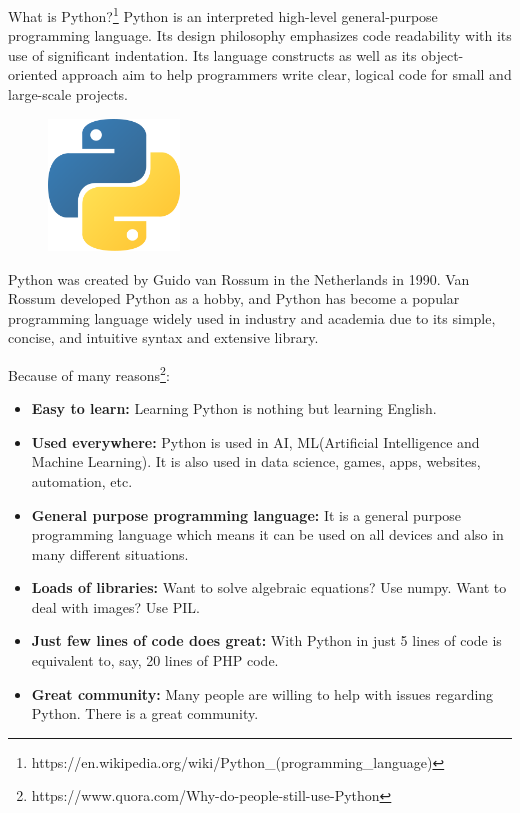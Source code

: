 \begin{frame}{What is Python?\footnote{https://en.wikipedia.org/wiki/Python\_(programming\_language)} }
  Python is an interpreted high-level general-purpose programming language. Its design philosophy emphasizes code readability with its use of significant indentation. Its language constructs as well as its object-oriented approach aim to help programmers write clear, logical code for small and large-scale projects.
\pause
\vspace{0.6cm}
\begin{figure}
\includegraphics[width=3.5cm,height=3.5cm,keepaspectratio]{img/python_logo.png}
\end{figure}


\end{frame}
\begin{frame}
  Python was created by Guido van Rossum in the Netherlands in 1990. Van Rossum developed  Python as a hobby, and Python has become a popular programming language widely used in industry and academia due to its simple, concise, and intuitive syntax and extensive library.
  

\end{frame}
\begin{frame}
  Because of many reasons\footnote{https://www.quora.com/Why-do-people-still-use-Python}:
\begin{itemize}
  \item  \textbf{Easy to learn:} Learning Python is nothing but learning English.\pause
  \item  \textbf{ Used everywhere:} Python is used in AI, ML(Artificial Intelligence and Machine Learning). It is also used in data science, games, apps, websites, automation, etc.\pause
  \item  \textbf{ General purpose programming language:} It is a general purpose programming language which means it can be used on all devices and also in many different situations.\pause
  \item  \textbf{ Loads of libraries:} Want to solve algebraic equations? Use numpy. Want to deal with images? Use PIL.\pause
  \item \textbf{Just few lines of code does great:} With Python in just 5 lines of code is equivalent to, say, 20 lines of PHP code.\pause
  \item  \textbf{ Great community:} Many people are willing to help with issues regarding Python. There is a great community.
    
\end{itemize}

\end{frame}
